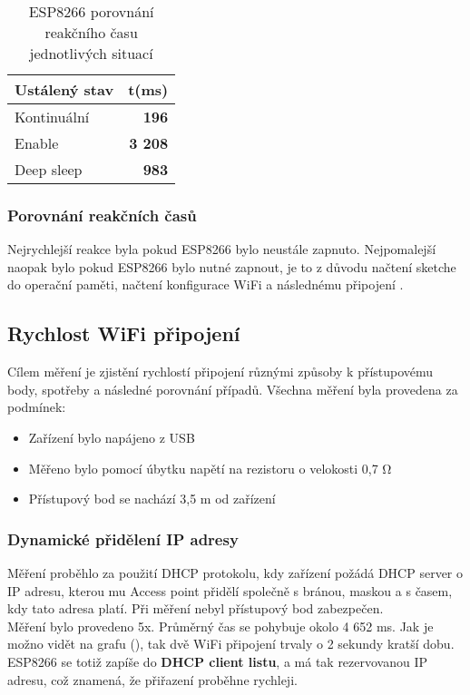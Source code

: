 \documentclass[a4paper, 12pt]{report}
\begin{document}

				\begin{table}[]
					\centering
					\caption{ESP8266 porovnání reakčního času jednotlivých situací}
					\begin{tabular}{||l|r||}
						\hline
						Ustálený stav & t(ms)\\
						\hline
						Kontinuální & {\bf 196}\\
						Enable & {\bf 3 208}\\
						Deep sleep & {\bf 983}\\
						\hline
					\end{tabular}
					\label{ESP8266 klidové režimy čas}
				\end{table}

				\subsubsection{Porovnání reakčních časů}
					Nejrychlejší reakce byla pokud ESP8266 bylo neustále zapnuto. Nejpomalejší naopak bylo pokud ESP8266 bylo nutné zapnout, je to z důvodu načtení sketche do operační paměti, načtení konfigurace WiFi a následnému připojení .

			\subsection{Rychlost WiFi připojení}
				Cílem měření je zjistění rychlostí připojení různými způsoby k přístupovému body, spotřeby a následné porovnání případů. Všechna měření byla provedena za podmínek:

				\begin{itemize}
					\item Zařízení bylo napájeno z USB
					\item Měřeno bylo pomocí úbytku napětí na rezistoru o velokosti 0,7 \si{\ohm}
					\item Přístupový bod se nachází 3,5 \si{m} od zařízení
				\end{itemize}

				\subsubsection{Dynamické přidělení IP adresy}
					Měření proběhlo za použití DHCP protokolu, kdy zařízení požádá DHCP server o IP adresu, kterou mu Access point přidělí společně s bránou, maskou a s časem, kdy tato adresa platí. Při měření nebyl přístupový bod zabezpečen.\\
					Měření bylo provedeno 5x. Průměrný čas se pohybuje okolo 4 652 \si{ms}. Jak je možno vidět na grafu (), tak dvě WiFi připojení trvaly o 2 sekundy kratší dobu. ESP8266 se totiž zapíše do \textbf{DHCP client listu}, a má tak rezervovanou IP adresu, což znamená, že přiřazení proběhne rychleji.
\end{document}
